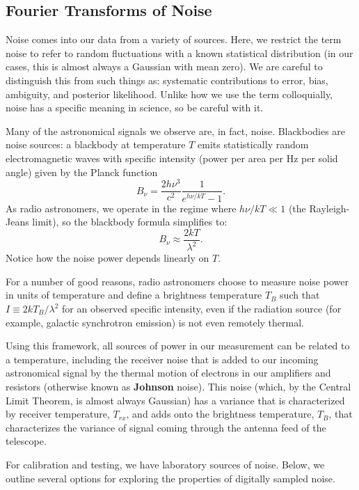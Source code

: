 \documentclass[11pt,preprint]{aastex}
\begin{document}
\subsection{Fourier Transforms of Noise}

\noindent
Noise comes into our data from a variety of sources. 
Here, we restrict the term noise to refer to random fluctuations with a known statistical distribution (in
our cases, this is almost always a Gaussian with mean zero). We are careful to distinguish
this from such things as: systematic contributions to error, bias, ambiguity, and posterior likelihood.
Unlike how we use the term colloquially, noise has a specific meaning in science, so be careful with it.

Many of the astronomical signals we observe are, in fact, noise. 
Blackbodies are noise sources: a blackbody at temperature $T$ emits statistically 
random electromagnetic waves
with specific intensity (power per area per Hz per solid angle) given by the 
Planck function
\begin{equation}
B_\nu = \frac{2h\nu^3}{c^2}\frac{1}{e^{h\nu/kT}-1}. 
\end{equation}
As radio astronomers, we
operate in the regime where $h\nu/kT \ll 1$ (the Rayleigh-Jeans limit), 
so the blackbody formula simplifies to:
\begin{equation}
B_\nu\approx\frac{2kT}{\lambda^2}. 
\end{equation}
Notice how the noise power depends linearly on $T$. 

For a number of good reasons, radio astronomers choose to measure noise
power in units of temperature and define a brightness temperature
$T_B$ such that $I\equiv2kT_B/\lambda^2$ for an observed specific intensity,
even if the radiation source (for example, galactic synchrotron emission) is not even remotely thermal.

Using this framework, all sources of power in our measurement can be related to a temperature,
including the receiver noise that is added to our incoming astronomical signal 
by the thermal motion of electrons in our amplifiers and resistors 
(otherwise known as {\bf Johnson} noise).  This noise (which,
by the Central Limit Theorem, is almost always Gaussian) has a variance that
is characterized by receiver temperature, $T_{rx}$, and adds onto the brightness temperature, $T_B$, 
that characterizes the variance of signal coming through the antenna feed of the telescope.

For calibration and testing, we have laboratory sources of noise. Below, we outline
several options for exploring
the properties of digitally sampled noise.
\end{document}
